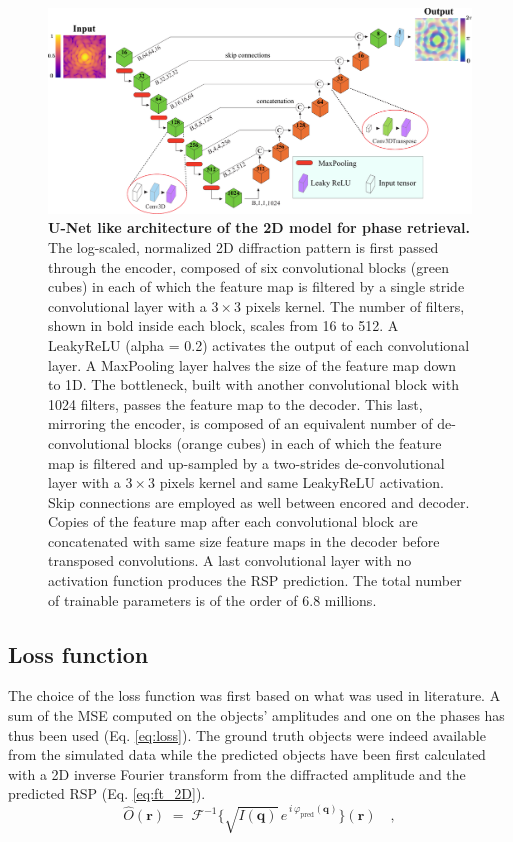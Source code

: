 \begin{figure}[H]
    \centering
    \includegraphics[width=\textwidth]{figures/Phasing/2D_model_arch.pdf}
    \caption{\textbf{U-Net like architecture of the 2D model for phase retrieval.} The log-scaled, normalized 2D diffraction 
    pattern is first passed through the encoder, composed of six convolutional blocks (green cubes) in each of which 
    the feature map is filtered by a single stride convolutional layer with a $3\times3$ pixels kernel. The number 
    of filters, shown in bold inside each block, scales from 16 to 512. A LeakyReLU (alpha = 0.2) activates the output 
    of each convolutional layer. A MaxPooling layer halves the size of the feature map down to 1D. The bottleneck, built 
    with another convolutional block with 1024 filters, passes the feature map to the decoder. This last, mirroring 
    the encoder, is composed of an equivalent number of de-convolutional blocks (orange cubes) in each of which the 
    feature map is filtered and up-sampled by a two-strides de-convolutional layer with a $3\times3$ pixels kernel 
    and same LeakyReLU activation. Skip connections are employed as well between encored and decoder. Copies of the 
    feature map after each convolutional block are concatenated with same size feature maps in the decoder before 
    transposed convolutions. A last convolutional layer with no activation function produces the RSP prediction. 
    The total number of trainable parameters is of the order of 6.8 millions. }
    \label{fig:model_2d_arch}
\end{figure}

\subsection{Loss function}
The choice of the loss function was first based on what was used in literature. 
A sum of the MSE computed on the objects' amplitudes and one on the phases has thus been used (Eq. \ref{eq:loss}). The ground truth 
objects were indeed available from the simulated data while the predicted objects have been first calculated with a 2D  
inverse Fourier transform from the diffracted amplitude and the predicted RSP (Eq. \ref{eq:ft_2D}). 
\begin{equation}
    \hat{O}(\mathbf{r})
    \;=\;
    \mathcal{F}^{-1}\!\bigl\{\sqrt{I(\mathbf{q})}\,e^{\,i\,\varphi_{\mathrm{pred}}(\mathbf{q})}\bigr\}(\mathbf{r})
    \quad,
    \label{eq:ft_2D}
\end{equation}

